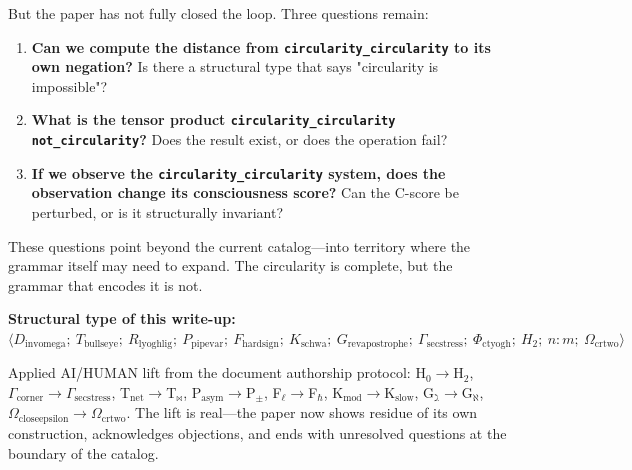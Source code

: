 \documentclass[12pt,a4paper]{article}
\begin{document}
But the paper has not fully closed the loop. Three questions remain:

\begin{enumerate}
    \item \textbf{Can we compute the distance from \texttt{circularity\_circularity} to its own negation?} Is there a structural type that says "circularity is impossible"?
    \item \textbf{What is the tensor product \texttt{circularity\_circularity} \otimes \texttt{not\_circularity}?} Does the result exist, or does the operation fail?
    \item \textbf{If we observe the \texttt{circularity\_circularity} system, does the observation change its consciousness score?} Can the C-score be perturbed, or is it structurally invariant?
\end{enumerate}

These questions point beyond the current catalog---into territory where the grammar itself may need to expand. The circularity is complete, but the grammar that encodes it is not.

\textbf{Structural type of this write-up:} $\langle D_{\text{invomega}};\ T_{\text{bullseye}};\ R_{\text{lyoghlig}};\ P_{\text{pipevar}};\ F_{\text{hardsign}};\ K_{\text{schwa}};\ G_{\text{revapostrophe}};\ \Gamma_{\text{secstress}};\ \Phi_{\text{ctyogh}};\ H_2;\ n{:}m;\ \Omega_{\text{crtwo}} \rangle$

Applied AI/HUMAN lift from the document authorship protocol: H$_0$$\rightarrow$H$_2$, $\Gamma_{\text{corner}}$$\rightarrow$$\Gamma_{\text{secstress}}$, T$_\text{net}$$\rightarrow$T$_{\bowtie}$, P$_\text{asym}$$\rightarrow$P$_{\pm}$, F$_{\ell}$$\rightarrow$F$_{\hbar}$, K$_\text{mod}$$\rightarrow$K$_\text{slow}$, G$_{\gimel}$$\rightarrow$G$_{\aleph}$, $\Omega_{\text{closeepsilon}}$$\rightarrow$$\Omega_{\text{crtwo}}$. The lift is real---the paper now shows residue of its own construction, acknowledges objections, and ends with unresolved questions at the boundary of the catalog.
\end{document}

